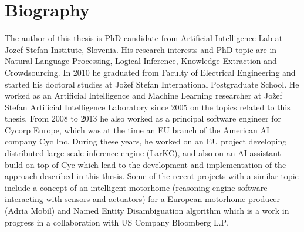 % 
\chapter{Biography}

The author of this thesis is PhD candidate from Artificial Intelligence Lab at 
Jozef Stefan Institute, Slovenia. His research interests and PhD topic are in 
Natural Language Processing, Logical Inference, Knowledge Extraction and
Crowdsourcing. In 2010 he graduated from Faculty of Electrical Engineering and
started his doctoral studies at Jožef Stefan International Postgraduate School.
He worked as an Artificial Intelligence and Machine Learning researcher at
Jožef Stefan Artificial Intelligence Laboratory since 2005 on the topics related
to this thesis. From 2008 to 2013 he also worked as a principal software 
engineer for Cycorp Europe, which was at the time an EU branch of the American 
AI company Cyc Inc. During these years, he worked on an EU project developing 
distributed large scale inference engine (LarKC), and also on an AI assistant 
build on top of Cyc which lead to the development and implementation of the
approach described in this thesis. Some of the recent projects with a similar
topic include a concept of an intelligent motorhome (reasoning engine software 
interacting with sensors and actuators) for a European motorhome producer 
(Adria Mobil) and Named Entity Disambiguation algorithm which is a work in 
progress in a collaboration with US Company Bloomberg L.P.
